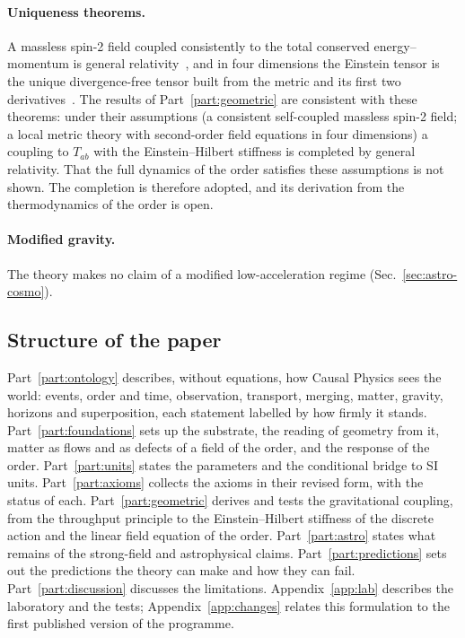 \paragraph{Uniqueness theorems.} A massless spin-2 field coupled consistently to the total conserved
energy--momentum is general relativity~\cite{Deser1970,FeynmanGravitation}, and in four dimensions
the Einstein tensor is the unique divergence-free tensor built from the metric and its first two
derivatives~\cite{Lovelock1971}. The results of Part~\ref{part:geometric} are consistent with these
theorems: under their assumptions (a consistent self-coupled massless spin-2 field; a local metric theory with
second-order field equations in four dimensions) a coupling to $T_{ab}$ with the Einstein--Hilbert stiffness is
completed by general relativity. That the full dynamics of the order satisfies these assumptions is not shown. The
completion is therefore adopted, and its derivation from the thermodynamics of the order is open.

\paragraph{Modified gravity.} The theory makes no claim of a modified low-acceleration regime
(Sec.~\ref{sec:astro-cosmo}).

\subsection{Structure of the paper}

Part~\ref{part:ontology} describes, without equations, how Causal Physics sees the world: events,
order and time, observation, transport, merging, matter, gravity, horizons and superposition, each
statement labelled by how firmly it stands. Part~\ref{part:foundations} sets up the substrate, the reading of geometry from it, matter as flows
and as defects of a field of the order, and the response of the order. Part~\ref{part:units} states the parameters and the conditional
bridge to SI units. Part~\ref{part:axioms} collects the axioms in their revised form, with the status
of each. Part~\ref{part:geometric} derives and tests the gravitational coupling, from the throughput
principle to the Einstein--Hilbert stiffness of the discrete action and the linear field equation of the
order. Part~\ref{part:astro} states what
remains of the strong-field and astrophysical claims. Part~\ref{part:predictions} sets out the
predictions the theory can make and how they can fail. Part~\ref{part:discussion} discusses the
limitations. Appendix~\ref{app:lab} describes the laboratory and the tests;
Appendix~\ref{app:changes} relates this formulation to the first published version of the
programme.
